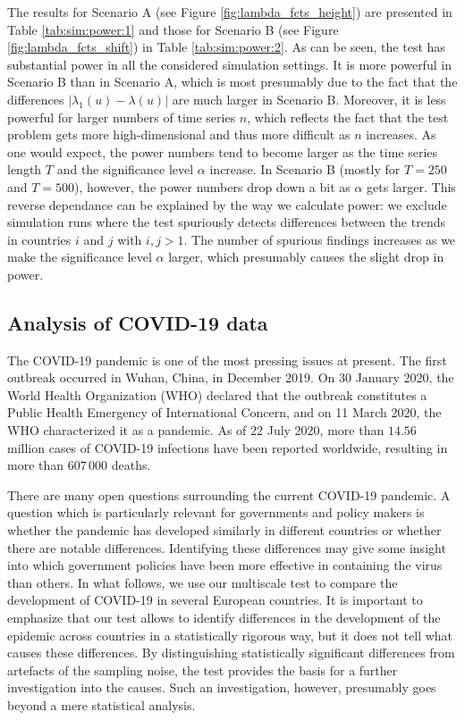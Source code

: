 \documentclass[a4paper,12pt]{article}
\numberwithin{equation}{section}
\begin{document}
The results for Scenario A (see Figure \ref{fig:lambda_fcts_height}) are presented in Table \ref{tab:sim:power:1} and those for Scenario B (see Figure \ref{fig:lambda_fcts_shift}) in Table \ref{tab:sim:power:2}. As can be seen, the test has substantial power in all the considered simulation settings. It is more powerful in Scenario B than in Scenario A, which is most presumably due to the fact that the differences $|\lambda_1(u) - \lambda(u)|$ are much larger in Scenario B. Moreover, it is less powerful for larger numbers of time series $n$, which reflects the fact that the test problem gets more high-dimensional and thus more difficult as $n$ increases. As one would expect, the power numbers tend to become larger as the time series length $T$ and the significance level $\alpha$ increase. In Scenario B (mostly for $T=250$ and $T=500$), however, the power numbers drop down a bit as $\alpha$ gets larger. This reverse dependance can be explained by the way we calculate power: we exclude simulation runs where the test spuriously detects differences between the trends in countries $i$ and $j$ with $i, j > 1$. The number of spurious findings increases as we make the significance level $\alpha$ larger, which presumably causes the slight drop in power.


\subsection{Analysis of COVID-19 data}\label{subsec:app}


The COVID-19 pandemic is one of the most pressing issues at present. The first outbreak occurred in Wuhan, China, in December 2019. On 30 January 2020, the World Health Organization (WHO) declared that the outbreak constitutes a Public Health Emergency of International Concern, and on 11 March 2020, the WHO characterized it as a pandemic. As of 22 July 2020, more than $14.56$ million cases of COVID-19 infections have been reported worldwide, resulting in more than $607\,000$ deaths.


There are many open questions surrounding the current COVID-19 pandemic. A question which is particularly relevant for governments and policy makers is whether the pandemic has developed similarly in different countries or whether there are notable differences. Identifying these differences may give some insight into which government policies have been more effective in containing the virus than others. In what follows, we use our multiscale test to compare the development of COVID-19 in several European countries. It is important to emphasize that our test allows to identify differences in the development of the epidemic across countries in a statistically rigorous way, but it does not tell what causes these differences. By distinguishing statistically significant differences from artefacts of the sampling noise, the test provides the basis for a further investigation into the causes. Such an investigation, however, presumably goes beyond a mere statistical analysis. 
\end{document}

